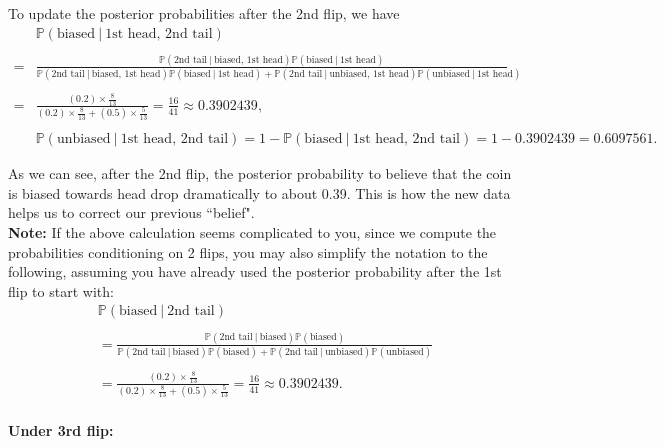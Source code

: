 \documentclass{article}
\def\dsst{\displaystyle}
\begin{document}
To update the posterior probabilities after the 2nd flip, we have
\begin{align*}
& \mathbb{P}(\text{biased}~|~\text{1st head, 2nd tail})\\
& \\
= & \frac{\mathbb{P}(\text{2nd tail}~|~\text{biased, 1st head})\mathbb{P}(\text{biased}~|~\text{1st head})}{\mathbb{P}(\text{2nd tail}~|~\text{biased, 1st head})\mathbb{P}(\text{biased}~|~\text{1st head}) + \mathbb{P}(\text{2nd tail}~|~\text{unbiased, 1st head})\mathbb{P}(\text{unbiased}~|~\text{1st head})}\\
& \\
= & \frac{\dsst (0.2)\times\frac{8}{13}}{\dsst (0.2)\times \frac{8}{13} + (0.5)\times \frac{5}{13}} = \frac{16}{41} \approx 0.3902439,\\
& \\
& \mathbb{P}(\text{unbiased}~|~\text{1st head, 2nd tail}) = 1-\mathbb{P}(\text{biased}~|~\text{1st head, 2nd tail}) = 1-0.3902439 = 0.6097561.
\end{align*}

As we can see, after the 2nd flip, the posterior probability to believe that the coin is biased towards head drop dramatically to about 0.39. This is how the new data helps us to correct our previous ``belief".\\

\textbf{Note:} If the above calculation seems complicated to you, since we compute the probabilities conditioning on 2 flips, you may also simplify the notation to the following, assuming you have already used the posterior probability after the 1st flip to start with:
\begin{align*}
& \mathbb{P}(\text{biased}~|~\text{2nd tail})\\
& \\
& = \dsst \frac{\mathbb{P}(\text{2nd tail}~|~\text{biased})\mathbb{P}(\text{biased})}{\mathbb{P}(\text{2nd tail}~|~\text{biased})\mathbb{P}(\text{biased}) + \mathbb{P}(\text{2nd tail}~|~\text{unbiased})\mathbb{P}(\text{unbiased})}\\
&  \\
& = \frac{\dsst (0.2)\times \frac{8}{13}}{\dsst (0.2)\times\frac{8}{13}+(0.5)\times\frac{5}{13}} = \frac{16}{41} \approx 0.3902439. \\
\end{align*}

\textbf{Under 3rd flip:}\\
\end{document}
